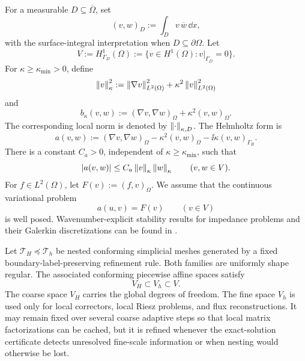 For a measurable $D\subseteq\overline\Omega$, set
\begin{equation}
\label{eq:L2-inner-product}
  (v,w)_D:=\int_D v\,\overline w\,\dd x,
\end{equation}
with the surface-integral interpretation when $D\subseteq\partial\Omega$.
Let
\[
  V:=H^1_{\Gamma_D}(\Omega)
  :=\{v\in H^1(\Omega):v|_{\Gamma_D}=0\}.
\]
For $\kappa\geq\kappa_{\min}>0$, define
\begin{equation}
\label{eq:kappa-norm}
  \left\lVert v\right\rVert_\kappa^2
  :=\left\lVert \nabla v\right\rVert_{L^2(\Omega)}^2
    +\kappa^2\left\lVert v\right\rVert_{L^2(\Omega)}^2
\end{equation}
and
\begin{equation}
\label{eq:energy-form}
  b_\kappa(v,w)
  :=(\nabla v,\nabla w)_\Omega+\kappa^2(v,w)_\Omega.
\end{equation}
The corresponding local norm is denoted by $\left\lVert \cdot\right\rVert_{\kappa,D}$.
The Helmholtz form is
\begin{equation}
\label{eq:helmholtz-form}
  a(v,w)
  :=(\nabla v,\nabla w)_\Omega
    -\kappa^2(v,w)_\Omega
    -\ii\kappa(v,w)_{\Gamma_R}.
\end{equation}
There is a constant $C_a>0$, independent of $\kappa\geq\kappa_{\min}$,
such that
\begin{equation}
\label{eq:a-continuity}
  |a(v,w)|\leq C_a\left\lVert v\right\rVert_\kappa\left\lVert w\right\rVert_\kappa
  \qquad(v,w\in V).
\end{equation}
For $f\in L^2(\Omega)$, let $F(v):=(f,v)_\Omega$.  We assume that the
continuous variational problem
\begin{equation}
\label{eq:continuous-problem}
  a(u,v)=F(v)\qquad(v\in V)
\end{equation}
is well posed.  Wavenumber-explicit stability results for impedance
problems and their Galerkin discretizations can be found in
\cite{EsterhazyMelenk2012,MelenkSauter2011}.

Let $\mathcal T_H\preceq\mathcal T_h$ be nested conforming simplicial
meshes generated by a fixed boundary-label-preserving refinement rule.
Both families are uniformly shape regular.  The associated conforming
piecewise affine spaces satisfy
\begin{equation}
\label{eq:space-nesting}
  V_H\subset V_h\subset V.
\end{equation}
The coarse space $V_H$ carries the global degrees of freedom.  The fine
space $V_h$ is used only for local correctors, local Riesz problems, and
flux reconstructions.  It may remain fixed over several coarse adaptive
steps so that local matrix factorizations can be cached, but it is refined
whenever the exact-solution certificate detects unresolved fine-scale
information or when nesting would otherwise be lost.

